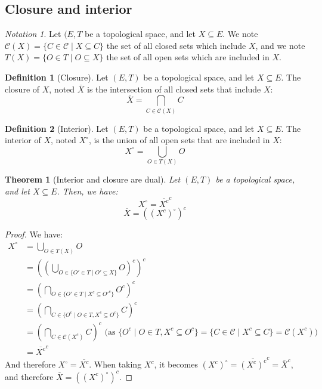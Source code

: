 \documentclass{article}
\newtheorem{theorem}{Theorem}[section]
\theoremstyle{definition}
\newtheorem{definition}{Definition}[section]
\theoremstyle{remark}
\theoremstyle{example}
\theoremstyle{notation}
\newtheorem{notation}{Notation}[section]
\newcommand{\inter}[1]{{{#1}^\circ}}
\newcommand{\closed}{\mathcal{C}}
\newcommand{\lr}[1]{\left(#1\right)}
\begin{document}
\subsection{Closure and interior}

\begin{notation}
		Let $(E, T$ be a topological space, and let $X \subseteq E$. We note $\closed(X) = \{C \in \closed \mid X \subseteq C\}$ the set of all closed sets which include $X$, and we note $T(X) = \{O \in T \mid O \subseteq X\}$ the set of all open sets which are included in $X$.
\end{notation}

\begin{definition}[Closure] %
		Let $(E, T)$ be a topological space, and let $X \subseteq E$. The closure of $X$, noted $\overline{X}$ is the intersection of all closed sets that include $X$:
				$$\overline{X} = \bigcap_{C \in \closed(X)} C$$
\end{definition}

\begin{definition}[Interior]
		Let $(E, T)$ be a topological space, and let $X \subseteq E$. The interior of $X$, noted $\inter{X}$, is the union of all open sets that are included in $X$:
				$$\inter{X} = \bigcup_{O \in T(X)} O$$
\end{definition}

\begin{theorem}[Interior and closure are dual]
		Let $(E, T)$ be a topological space, and let $X \subseteq E$. Then, we have:
				$$\inter{X} = \overline{X^c}^c$$
				$$\overline{X} = (\inter{(X^c)})^c$$
\end{theorem}

\begin{proof}
		We have:
		\begin{align*}
				\inter{X} &= \bigcup_{O \in T(X)} O\\
						  &= \lr{\lr{\bigcup_{O \in \{O' \in T \mid O' \subseteq X\}} O}^c}^c\\
						  &= \lr{\bigcap_{O \in \{O' \in T \mid X^c \subseteq O'^c\}} O^c}^c\\
						  &= \lr{\bigcap_{C \in \{O^c \mid O \in T, X^c \subseteq O^c\}} C}^c\\
						  &= \lr{\bigcap_{C \in \closed(X^c)} C}^c \text{ (as $\{O^c \mid O \in T, X^c \subseteq O^c\} = \{C \in \closed \mid X^c \subseteq C\} = \closed(X^c)$)}\\
						  &= \overline{X^c}^c
		\end{align*}
		And therefore $\inter{X} = \overline{X^c}$. When taking $X^c$, it becomes $\inter{(X^c)} = \overline{(X^c)^c}^c = \overline{X}^c$, and therefore $\overline{X} = (\inter{(X^c)})^c$.
\end{proof}
\end{document}
